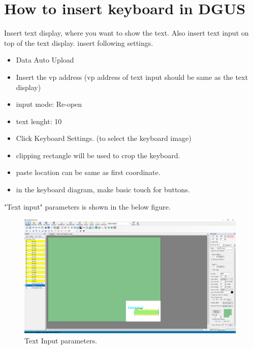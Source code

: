 \documentclass[12pt, A4]{article} %
\begin{document}
\section{How to insert keyboard in DGUS}
Insert text display, where you want to show the text. Also insert text input on top of the text display. insert following settings.

\begin{itemize}
\item Data Auto Upload
\item Insert the vp address (vp address of text input should be same as the text display)
\item input mode: Re-open
\item text lenght: 10
\item Click Keyboard Settings. (to select the keyboard image)
\item clipping rectangle will be used to crop the keyboard.
\item paste location can be same as first coordinate.
\item in the keyboard diagram, make basic touch for buttons.
\end{itemize}

"Text input" parameters is shown in the below figure.

\begin{figure}[!htb] %
	\centering
	\includegraphics[width=11cm]{textInput} 
	\caption{Text Input parameters.\\}
\end{figure}

\newpage
\end{document}
